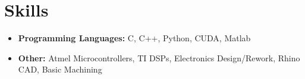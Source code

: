 \documentclass[line]{res}
\def\uiuc{University of Illinois at Urbana-Champaign}
\def\spaceline{\vspace{1mm} \fullline}
\begin{document}
\begin{resume}
\begin{itemize}
\end{itemize}





	\vspace{-3mm}
	\section{Skills}
	\begin{itemize}
	\item 
	\spaceline
{\bf Programming Languages: } C, C++, Python, CUDA, Matlab
\item {\bf Other: } Atmel Microcontrollers, TI DSPs, Electronics Design/Rework, Rhino CAD, Basic Machining
\end{itemize}

		\end{resume}
		
\end{document}
